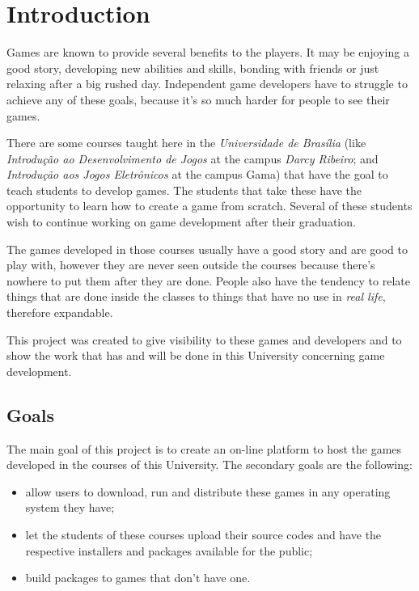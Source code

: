 \chapter*[Introduction]{Introduction}

Games are known to provide several benefits to the players. It may be enjoying a good story, developing new abilities and skills, bonding with friends or just relaxing after a big rushed day. Independent game developers have to struggle to achieve any of these goals, because it's so much harder for people to see their games.

There are some courses taught here in the \textit{Universidade de Bras\'ilia} (like \textit{Introdução ao Desenvolvimento de Jogos} at the campus \textit{Darcy Ribeiro}; and \textit{Introdução aos Jogos Eletrônicos} at the campus Gama) that have the goal to teach students to develop games. The students that take these have the opportunity to learn how to create a game from scratch. Several of these students wish to continue working on game development after their graduation.

The games developed in those courses usually have a good story and are good to play with, however they are never seen outside the courses because there's nowhere to put them after they are done. People also have the tendency to relate things that are done inside the classes to things that have no use in \textit{real life}, therefore expandable.

This project was created to give visibility to these games and developers and to show the work that has and will be done in this University concerning game development.

\section*{Goals}

The main goal of this project is to create an on-line platform to host the games developed in the courses of this University. The secondary goals are the following:

\begin{itemize}
\item allow users to download, run and distribute these games in any operating system they have;
\item let the students of these courses upload their source codes and have the respective installers and packages available for the public;
\item build packages to games that don't have one.
\end{itemize}

